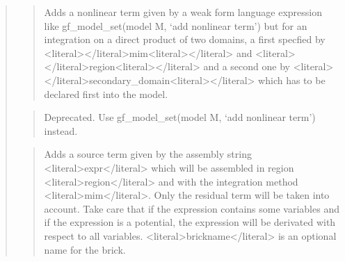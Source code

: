 \documentclass[a4paper,11pt,english]{sphinxmanual}
\begin{document}
\begin{quote}
\sphinxAtStartPar
{}
\begin{quote}

\sphinxAtStartPar
Adds a nonlinear term given by a weak form language expression like
gf\_model\_set(model M, ‘add nonlinear term’) but for an integration on a direct
product of two domains, a first specfied by \textless{}literal\textgreater{}\textless{}/literal\textgreater{}mim\textless{}literal\textgreater{}\textless{}/literal\textgreater{} and \textless{}literal\textgreater{}\textless{}/literal\textgreater{}region\textless{}literal\textgreater{}\textless{}/literal\textgreater{}
and a second one by \textless{}literal\textgreater{}\textless{}/literal\textgreater{}secondary\_domain\textless{}literal\textgreater{}\textless{}/literal\textgreater{} which has to be declared
first into the model.
\end{quote}

\sphinxAtStartPar
{}
\begin{quote}

\sphinxAtStartPar
Deprecated. Use gf\_model\_set(model M, ‘add nonlinear term’) instead.
\end{quote}

\sphinxAtStartPar
{}
\begin{quote}

\sphinxAtStartPar
Adds a source term given by the assembly string \textless{}literal\textgreater{}expr\textless{}/literal\textgreater{} which will
be assembled in region \textless{}literal\textgreater{}region\textless{}/literal\textgreater{} and with the integration method \textless{}literal\textgreater{}mim\textless{}/literal\textgreater{}.
Only the residual term will be taken into account.
Take care that if the expression contains some variables and if the
expression is a potential, the expression will be
derivated with respect to all variables.
\textless{}literal\textgreater{}brickname\textless{}/literal\textgreater{} is an optional name for the brick.
\end{quote}


\end{quote}
\end{document}
